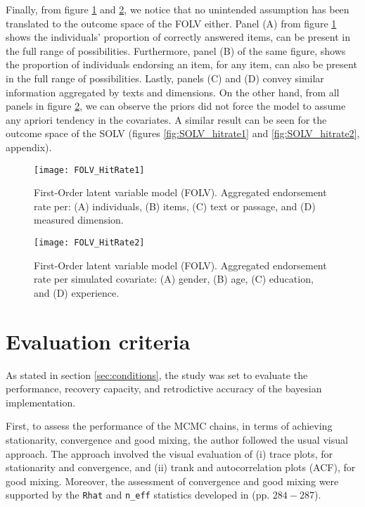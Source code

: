 Finally, from figure \ref{fig:FOLV_hitrate1} and \ref{fig:FOLV_hitrate2}, we notice that no unintended assumption has been translated to the outcome space of the FOLV either. Panel (A) from figure \ref{fig:FOLV_hitrate1} shows the individuals'  proportion of correctly answered items, can be present in the full range of possibilities. Furthermore, panel (B) of the same figure, shows the proportion of individuals endorsing an item, for any item, can also be present in the full range of possibilities. Lastly, panels (C) and (D) convey similar information aggregated by texts and dimensions. On the other hand, from all panels in figure \ref{fig:FOLV_hitrate2}, we can observe the priors did not force the model to assume any apriori tendency in the covariates. A similar result can be seen for the outcome space of the SOLV (figures \ref{fig:SOLV_hitrate1} and \ref{fig:SOLV_hitrate2}, appendix).
%
\begin{figure}[h]
	\centering
	\texttt{[image: FOLV\_HitRate1]}
	\caption[First-Order latent variable model (FOLV). Hit rate per dimensions of interest.]%
	{First-Order latent variable model (FOLV). Aggregated endorsement rate per: (A) individuals, (B) items, (C) text or passage, and (D) measured dimension.}
	\label{fig:FOLV_hitrate1}
\end{figure}
%
\begin{figure}[h]
	\centering
	\texttt{[image: FOLV\_HitRate2]}
	\caption[First-Order latent variable model (FOLV). Hit rate per simulated covariate.]%
	{First-Order latent variable model (FOLV). Aggregated endorsement rate per simulated covariate: (A) gender, (B) age, (C) education, and (D) experience.}
	\label{fig:FOLV_hitrate2}
\end{figure}


\section{Evaluation criteria}

As stated in section \ref{sec:conditions}, the study was set to evaluate the performance, recovery capacity, and retrodictive accuracy of the bayesian implementation.

First, to assess the performance of the MCMC chains, in terms of achieving stationarity, convergence and good mixing, the author followed the usual visual approach. The approach involved the visual evaluation of (i) trace plots, for stationarity and convergence, and (ii) trank and autocorrelation plots (ACF), for good mixing. Moreover, the assessment of convergence and good mixing were supported by the \texttt{Rhat} and \texttt{n\_eff} statistics developed in \citet{Gelman_et_al_2014} (pp. $284-287$).

